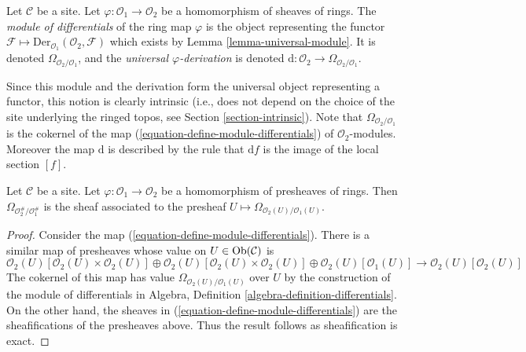 \begin{definition}
\label{definition-module-differentials}
Let $\mathcal{C}$ be a site. Let $\varphi : \mathcal{O}_1 \to \mathcal{O}_2$
be a homomorphism of sheaves of rings. The {\it module of differentials}
of the ring map $\varphi$ is the object representing the functor
$\mathcal{F} \mapsto \text{Der}_{\mathcal{O}_1}(\mathcal{O}_2, \mathcal{F})$
which exists by Lemma \ref{lemma-universal-module}.
It is denoted $\Omega_{\mathcal{O}_2/\mathcal{O}_1}$, and the {\it universal
$\varphi$-derivation} is denoted
$\text{d} : \mathcal{O}_2 \to \Omega_{\mathcal{O}_2/\mathcal{O}_1}$.
\end{definition}

\noindent
Since this module and the derivation form the universal object representing
a functor, this notion is clearly intrinsic (i.e., does not depend
on the choice of the site underlying the ringed topos, see
Section \ref{section-intrinsic}).
Note that $\Omega_{\mathcal{O}_2/\mathcal{O}_1}$ is the cokernel of
the map (\ref{equation-define-module-differentials}) of
$\mathcal{O}_2$-modules. Moreover the map $\text{d}$ is described
by the rule that $\text{d}f$ is the image of the local section $[f]$.

\begin{lemma}
\label{lemma-differentials-sheafify}
Let $\mathcal{C}$ be a site. Let $\varphi : \mathcal{O}_1 \to \mathcal{O}_2$
be a homomorphism of presheaves of rings. Then
$\Omega_{\mathcal{O}_2^\#/\mathcal{O}_1^\#}$ is the sheaf associated to the
presheaf $U \mapsto \Omega_{\mathcal{O}_2(U)/\mathcal{O}_1(U)}$.
\end{lemma}

\begin{proof}
Consider the map (\ref{equation-define-module-differentials}). There is
a similar map of presheaves whose value on $U \in \mathop{\mathrm{Ob}}\nolimits(\mathcal{C})$ is
$$
\mathcal{O}_2(U)[\mathcal{O}_2(U) \times \mathcal{O}_2(U)] \oplus
\mathcal{O}_2(U)[\mathcal{O}_2(U) \times \mathcal{O}_2(U)] \oplus
\mathcal{O}_2(U)[\mathcal{O}_1(U)]
\longrightarrow
\mathcal{O}_2(U)[\mathcal{O}_2(U)]
$$
The cokernel of this map has value $\Omega_{\mathcal{O}_2(U)/\mathcal{O}_1(U)}$
over $U$ by the construction of the module of differentials in 
Algebra, Definition \ref{algebra-definition-differentials}.
On the other hand, the sheaves in (\ref{equation-define-module-differentials})
are the sheafifications of the presheaves above. Thus the result follows
as sheafification is exact.
\end{proof}

